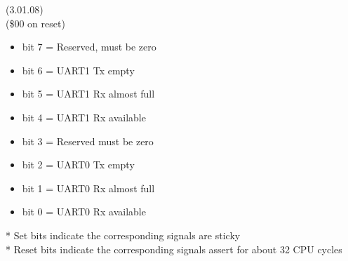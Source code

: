  (3.01.08)\\
(\$00 on reset)
\begin{itemize}
\item bit 7 = Reserved, must be zero
\item bit 6 = UART1 Tx empty
\item bit 5 = UART1 Rx almost full
\item bit 4 = UART1 Rx available
\item bit 3 = Reserved must be zero
\item bit 2 = UART0 Tx empty
\item bit 1 = UART0 Rx almost full
\item bit 0 = UART0 Rx available
\end{itemize}
* Set bits indicate the corresponding signals are sticky\\
* Reset bits indicate the corresponding signals assert for about 32 CPU cycles
